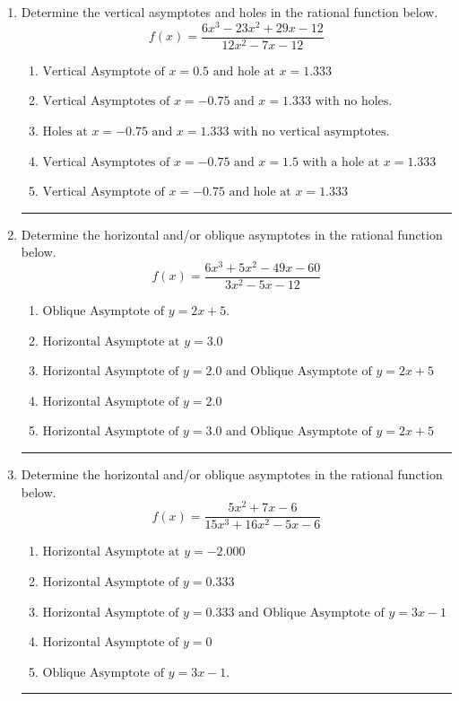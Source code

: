 \documentclass[14pt]{extbook}
\newcommand{\litem}[1]{\item#1\hspace*{-1cm}\rule{\textwidth}{0.4pt}}
\begin{document}
\begin{enumerate}
{\begin{enumerate}[label=\Alph*.]
\end{enumerate} }
\litem{
Determine the vertical asymptotes and holes in the rational function below.\[ f(x) = \frac{6x^{3} -23 x^{2} +29 x -12}{12x^{2} -7 x -12} \]\begin{enumerate}[label=\Alph*.]
\item \( \text{Vertical Asymptote of } x = 0.5 \text{ and hole at } x = 1.333 \)
\item \( \text{Vertical Asymptotes of } x = -0.75 \text{ and } x = 1.333 \text{ with no holes.} \)
\item \( \text{Holes at } x = -0.75 \text{ and } x = 1.333 \text{ with no vertical asymptotes.} \)
\item \( \text{Vertical Asymptotes of } x = -0.75 \text{ and } x = 1.5 \text{ with a hole at } x = 1.333 \)
\item \( \text{Vertical Asymptote of } x = -0.75 \text{ and hole at } x = 1.333 \)

\end{enumerate} }
\litem{
Determine the horizontal and/or oblique asymptotes in the rational function below.\[ f(x) = \frac{6x^{3} +5 x^{2} -49 x -60}{3x^{2} -5 x -12} \]\begin{enumerate}[label=\Alph*.]
\item \( \text{Oblique Asymptote of } y = 2x + 5. \)
\item \( \text{Horizontal Asymptote at } y = 3.0 \)
\item \( \text{Horizontal Asymptote of } y = 2.0 \text{ and Oblique Asymptote of } y = 2x + 5 \)
\item \( \text{Horizontal Asymptote of } y = 2.0  \)
\item \( \text{Horizontal Asymptote of } y = 3.0 \text{ and Oblique Asymptote of } y = 2x + 5 \)

\end{enumerate} }
\litem{
Determine the horizontal and/or oblique asymptotes in the rational function below.\[ f(x) = \frac{5x^{2} +7 x -6}{15x^{3} +16 x^{2} -5 x -6} \]\begin{enumerate}[label=\Alph*.]
\item \( \text{Horizontal Asymptote at } y = -2.000 \)
\item \( \text{Horizontal Asymptote of } y = 0.333  \)
\item \( \text{Horizontal Asymptote of } y = 0.333 \text{ and Oblique Asymptote of } y = 3x -1 \)
\item \( \text{Horizontal Asymptote of } y = 0 \)
\item \( \text{Oblique Asymptote of } y = 3x -1. \)


\end{enumerate}}
\end{enumerate}
\end{document}
